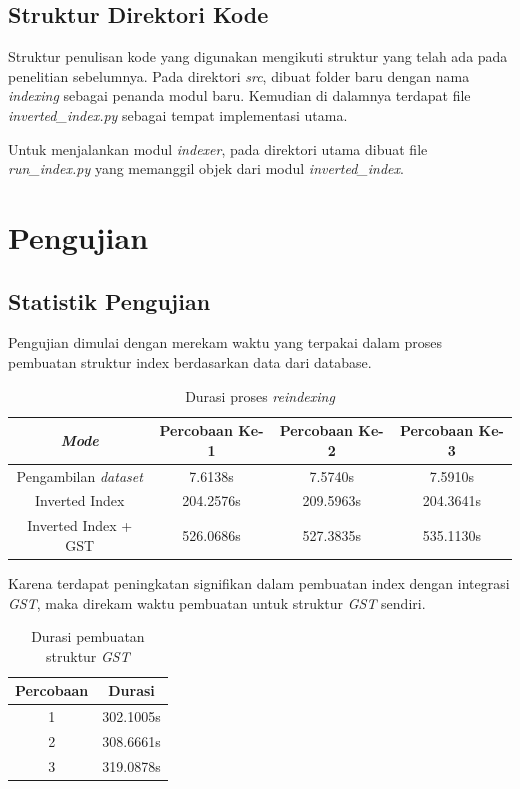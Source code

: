 \subsection{Struktur Direktori Kode}

Struktur penulisan kode yang digunakan mengikuti struktur yang telah ada pada 
penelitian sebelumnya. Pada direktori \textit{src}, dibuat folder baru dengan 
nama \textit{indexing} sebagai penanda modul baru. Kemudian di dalamnya terdapat 
file \textit{inverted\_index.py} sebagai tempat implementasi utama.

Untuk menjalankan modul \textit{indexer}, pada direktori utama dibuat file
\textit{run\_index.py} yang memanggil objek dari modul \textit{inverted\_index}.

\section{Pengujian}

\subsection{Statistik Pengujian}

Pengujian dimulai dengan merekam waktu yang terpakai dalam proses pembuatan
struktur index berdasarkan data dari database.

\begin{table}[H]
\begin{center}
  \caption{\label{tabel:durasi_reindex} Durasi proses \textit{reindexing}}
\begin{tabular}{|c|c|c|c|} 
 \hline
  \textit{Mode} & Percobaan Ke-1 & Percobaan Ke-2 & Percobaan Ke-3 \\ 
 \hline
  Pengambilan \textit{dataset} & 7.6138s & 7.5740s & 7.5910s \\
  Inverted Index & 204.2576s & 209.5963s & 204.3641s \\ 
  Inverted Index + GST & 526.0686s & 527.3835s & 535.1130s \\
 \hline
\end{tabular}
\end{center}
\end{table}

Karena terdapat peningkatan signifikan dalam pembuatan index dengan integrasi 
\textit{GST}, maka direkam waktu pembuatan untuk struktur \textit{GST} sendiri.

\begin{table}[H]
\begin{center}
  \caption{\label{tabel:durasi_gst} Durasi pembuatan struktur \textit{GST}}
\begin{tabular}{|c|c|} 
 \hline
  Percobaan & Durasi \\ 
 \hline
  1 & 302.1005s \\ 
  2 & 308.6661s \\
  3 & 319.0878s \\
 \hline
\end{tabular}
\end{center}
\end{table}

